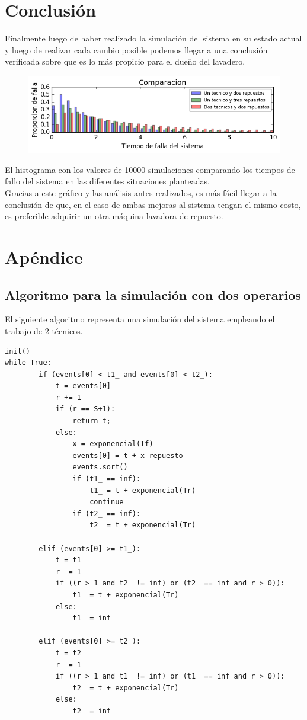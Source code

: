 \documentclass[10pt,a4paper]{article} %
\begin{document}
    \newpage
    \section{Conclusi\'on}
    Finalmente luego de haber realizado la simulaci\'on del sistema en su estado actual y luego de realizar cada cambio posible podemos llegar a una conclusi\'on verificada sobre que es lo m\'as propicio para el due\~no del lavadero. \\
    
    \begin {figure}[!htb]
    \centering
    \includegraphics[width=12cm] {img/comparisson}
    \end {figure}
    
    El histograma con los valores de 10000 simulaciones comparando los tiempos de fallo del sistema en las diferentes situaciones planteadas.\\ 
    Gracias a este gr\'afico y las an\'alisis antes realizados, es m\'as f\'acil llegar a la conclusi\'on de que, en el caso de ambas mejoras al sistema tengan el mismo costo, es preferible adquirir un otra m\'aquina lavadora de repuesto.

    \newpage
    \section{Ap\'endice}
    \subsection{Algoritmo para la simulaci\'on con dos operarios}
    El siguiente algoritmo representa una simulaci\'on del sistema empleando el trabajo de 2 t\'ecnicos.
    \begin{lstlisting}[caption=Funciones auxiliares.]
init()
while True:
        if (events[0] < t1_ and events[0] < t2_):
            t = events[0]
            r += 1
            if (r == S+1):
                return t;
            else:
                x = exponencial(Tf)
                events[0] = t + x repuesto
                events.sort()
                if (t1_ == inf):
                    t1_ = t + exponencial(Tr)
                    continue
                if (t2_ == inf):
                    t2_ = t + exponencial(Tr)

        elif (events[0] >= t1_):
            t = t1_
            r -= 1
            if ((r > 1 and t2_ != inf) or (t2_ == inf and r > 0)):
                t1_ = t + exponencial(Tr)
            else:
                t1_ = inf

        elif (events[0] >= t2_):
            t = t2_
            r -= 1
            if ((r > 1 and t1_ != inf) or (t1_ == inf and r > 0)):
                t2_ = t + exponencial(Tr)
            else: 
                t2_ = inf
    \end{lstlisting}
\end{document}
